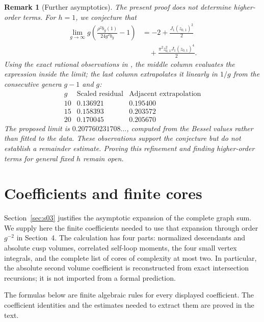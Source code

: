 \documentclass[a4paper,10pt]{article}
\numberwithin{equation}{section}
\theoremstyle{paperplain}
\theoremstyle{paperremark}
\newtheorem{rmk}{Remark}[section]
\theoremstyle{paperplain}
\begin{document}
\begin{samepage}
\begin{rmk}[Further asymptotics]\label{rmk:s08:further-asymptotics}
The present proof does not determine higher-order terms.
For $h=1$, we conjecture that
\[
 \begin{aligned}
 \lim_{g\to\infty}
 g\left(\frac{\rho^2b_g(1)}{24g^2b_g}-1\right)
 &=-2+\frac{J_1(z_{0,1})^2}{2}\\
 &\quad+\frac{\pi^2z_{0,1}^2J_1(z_{0,1})^4}{2}.
 \end{aligned}
\]
Using the exact rational observations in \cite{LiuData26}, the
middle column evaluates the expression inside the limit; the
last column extrapolates it linearly in $1/g$ from the consecutive
genera $g-1$ and $g$:
\[
 \begin{array}{c|cc}
 g&\text{Scaled residual}&\text{Adjacent extrapolation}\\ \hline
 10&0.136921&0.195400\\
 15&0.158393&0.203572\\
 20&0.170045&0.205670
 \end{array}
\]
The proposed limit is
$0.207760231708\ldots$, computed from the Bessel values rather
than fitted to the data. These observations support the conjecture
but do not establish a remainder estimate. Proving this refinement
and finding higher-order terms for general fixed $h$ remain open.
\end{rmk}
\end{samepage}


\appendix
\section{Coefficients and finite cores}
\label{sec:appendix-a}

Section~\ref{sec:s03} justifies the asymptotic expansion of the complete
graph sum. We supply here the finite coefficients needed to use that
expansion through order $g^{-2}$ in Section~4. The calculation has four
parts: normalized descendants and absolute cusp volumes, correlated
self-loop moments, the four small vertex integrals, and the complete
list of cores of complexity at most two. In particular, the absolute
second volume coefficient is reconstructed from exact intersection
recursions; it is not imported from a formal prediction.

The formulas below are finite algebraic rules for every displayed
coefficient. The coefficient identities and the estimates needed to
extract them are proved in the text.
\end{document}
